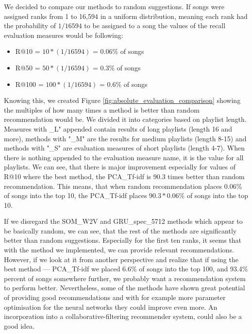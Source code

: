 We decided to compare our methods to random suggestions. If songs were assigned ranks from 1 to 16,594 in a uniform distribution, meaning each rank had the probability of $1/16594$ to be assigned to a song the values of the recall evaluation measures would be following:
\begin{itemize}
    \item R@10 =  $ 10*(1/16594) $ = 0.06\% of songs
    \item R@50 = $ 50*(1/16594) $ = 0.3\% of songs
    \item R@100 = $ 100*(1/16594) $ = 0.6\% of songs
\end{itemize}

Knowing this, we created Figure \ref{fig:absolute_evaluation_comparison} showing the multiples of how many times a method is better than random recommendation would be. We divided it into categories based on playlist length. Measures with \_L" appended contain results of long playlists (length 16 and more), methods with "\_M" are the results for medium playlists (length 8-15) and methods with "\_S" are evaluation measures of short playlists (length 4-7). When there is nothing appended to the evaluation measure name, it is the value for all playlists. We can see, that there is major improvement especially for values of R@10 where the best method, the PCA\_Tf-idf is 90.3 times better than random recommendation. This means, that when random recommendation places 0.06\% of songs into the top 10, the PCA\_Tf-idf places $90.3*0.06\%$ of songs into the top 10. 

If we disregard the SOM\_W2V and GRU\_spec\_5712 methods which appear to be basically random, we can see, that the rest of the methods are significantly better than random suggestions. Especially for the first ten ranks, it seems that with the method we implemented, we can provide relevant recommendations. \\

However, if we look at it from another perspective and realize that if using the best method --- PCA\_Tf-idf we placed 6.6\% of songs into the top 100, and 93.4\% percent of songs somewhere further, we probably want a recommendation system to perform better. Nevertheless, some of the methods have shown great potential of providing good recommendations and with for example more parameter optimisation for the neural networks they could improve even more. An incorporation into a collaborative-filtering recommender system, could also be a good idea.

